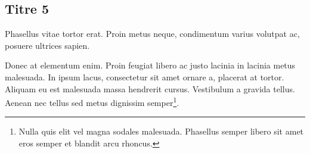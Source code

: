 \documentclass{jdt-tis}
\begin{document}
\begin{content}
  \section{Titre 5}
  Phasellus vitae tortor erat. Proin metus neque, condimentum varius volutpat ac, posuere ultrices sapien.

  Donec at elementum enim. Proin feugiat libero ac justo lacinia in lacinia metus malesuada. In ipsum lacus, consectetur sit amet ornare a, placerat at tortor. Aliquam eu est malesuada massa hendrerit cursus. Vestibulum a gravida tellus. Aenean nec tellus sed metus dignissim semper\footnote{Nulla quis elit vel magna sodales malesuada. Phasellus semper libero sit amet eros semper et blandit arcu rhoncus.}.

\end{content}


\end{document}
